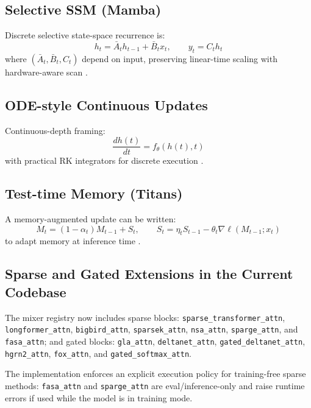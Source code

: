 \documentclass[11pt,a4paper]{article}
\begin{document}
\subsection{Selective SSM (Mamba)}
Discrete selective state-space recurrence is:
\[
h_t=\bar{A}_t h_{t-1}+\bar{B}_t x_t,\qquad y_t=C_t h_t
\]
where $(\bar{A}_t,\bar{B}_t,C_t)$ depend on input, preserving linear-time scaling with hardware-aware scan \citep{gu_mamba_2023,hwang_hydra_2024}.

\subsection{ODE-style Continuous Updates}
Continuous-depth framing:
\[
\frac{dh(t)}{dt}=f_\theta(h(t),t)
\]
with practical RK integrators for discrete execution \citep{zhang_continuous_2021}.

\subsection{Test-time Memory (Titans)}
A memory-augmented update can be written:
\[
M_t=(1-\alpha_t)M_{t-1}+S_t,\qquad
S_t=\eta_t S_{t-1}-\theta_t\nabla \ell(M_{t-1};x_t)
\]
to adapt memory at inference time \citep{behrouz_titans_2025,behrouz_titans_2024}.

\subsection{Sparse and Gated Extensions in the Current Codebase}
The mixer registry now includes sparse blocks:
\texttt{sparse\_transformer\_attn}, \texttt{longformer\_attn}, \texttt{bigbird\_attn},
\texttt{sparsek\_attn}, \texttt{nsa\_attn}, \texttt{sparge\_attn}, and \texttt{fasa\_attn};
and gated blocks:
\texttt{gla\_attn}, \texttt{deltanet\_attn}, \texttt{gated\_deltanet\_attn},
\texttt{hgrn2\_attn}, \texttt{fox\_attn}, and \texttt{gated\_softmax\_attn}.

The implementation enforces an explicit execution policy for training-free sparse methods:
\texttt{fasa\_attn} and \texttt{sparge\_attn} are eval/inference-only and raise runtime errors if used while the model is in training mode.
\end{document}
